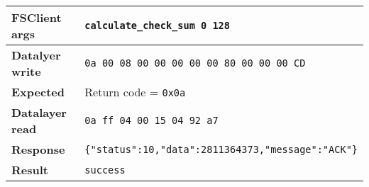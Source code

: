 \begin{center}
    \begin{tabular}{ | p{3cm} | l |}
    \hline

		\textbf{FSClient args} & \texttt{calculate\_check\_sum 0 128} \\ \hline
		\textbf{Datalyer write} & \texttt{0a 00 08 00 00 00 00 00 80 00 00 00 CD} \\ \hline
		\textbf{Expected} & Return code = \texttt{0x0a} \\ \hline
		\textbf{Datalayer read} & \texttt{0a ff 04 00 15 04 92 a7} \\ \hline
		\textbf{Response} & \texttt{\{"status":10,"data":2811364373,"message":"ACK"\}} \\ \hline
		\textbf{Result} & \texttt{success} \\ \hline

    \end{tabular}
\end{center}



